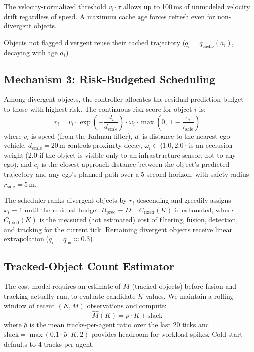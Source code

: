 The velocity-normalized threshold $v_i \cdot \tau$ allows up to
100\,ms of unmodeled velocity drift regardless of speed.  A maximum
cache age forces refresh even for non-divergent objects.

Objects not flagged divergent reuse their cached trajectory
($q_i = q_{\mathrm{cache}}(a_i)$, decaying with age $a_i$).

\subsection{Mechanism 3: Risk-Budgeted Scheduling}
\label{ssec:risk}

Among divergent objects, the controller allocates the residual
prediction budget to those with highest risk.  The continuous risk
score for object $i$ is:
\begin{equation}
  r_i = v_i \cdot \exp\!\left(-\frac{d_i}{d_{\mathrm{scale}}}\right)
    \cdot \omega_i
    \cdot \max\!\left(0,\; 1 - \frac{c_i}{r_{\mathrm{safe}}}\right)
  \label{eq:risk}
\end{equation}
where $v_i$ is speed (from the Kalman filter), $d_i$ is distance to
the nearest ego vehicle, $d_{\mathrm{scale}} = 20\,$m controls
proximity decay, $\omega_i \in \{1.0, 2.0\}$ is an occlusion weight
(2.0 if the object is visible only to an infrastructure sensor, not to
any ego), and $c_i$ is the closest-approach distance between the
object's predicted trajectory and any ego's planned path over a
5-second horizon, with safety radius $r_{\mathrm{safe}} = 5\,$m.

The scheduler ranks divergent objects by $r_i$ descending and greedily
assigns $x_i = 1$ until the residual budget
$B_{\mathrm{pred}} = D - C_{\mathrm{fixed}}(K)$ is exhausted, where
$C_{\mathrm{fixed}}(K)$ is the measured (not estimated) cost of
filtering, fusion, detection, and tracking for the current tick.
Remaining divergent objects receive linear extrapolation
($q_i = q_{\mathrm{lin}} \approx 0.3$).

\subsection{Tracked-Object Count Estimator}

The cost model requires an estimate of $M$ (tracked objects) before
fusion and tracking actually run, to evaluate candidate $K$ values.
We maintain a rolling window of recent $(K, M)$ observations and
compute:
\begin{equation}
  \hat{M}(K) = \bar{\rho} \cdot K + \mathrm{slack}
  \label{eq:mhat}
\end{equation}
where $\bar{\rho}$ is the mean tracks-per-agent ratio over the last 20
ticks and $\mathrm{slack} = \max(0.1 \cdot \bar{\rho} \cdot K, 2)$
provides headroom for workload spikes.  Cold start defaults to 4
tracks per agent.

